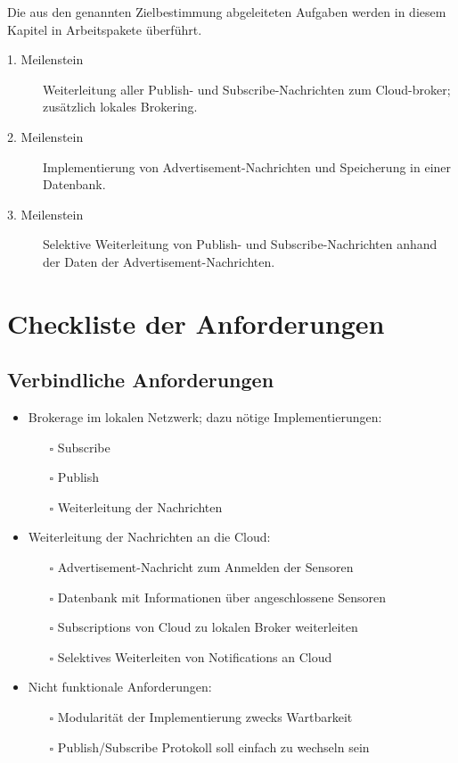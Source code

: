 \documentclass[fontsize=11pt,a4paper]{scrartcl}
\begin{document}
Die aus den genannten Zielbestimmung abgeleiteten Aufgaben werden in diesem Kapitel in Arbeitspakete überführt.

\begin{description}
\item[1. Meilenstein]
Weiterleitung aller Publish- und Subscribe-Nachrichten zum Cloud-broker; zusätzlich lokales Brokering.
\item[2. Meilenstein]
Implementierung von Advertisement-Nachrichten und Speicherung in einer Datenbank.
\item[3. Meilenstein]
Selektive Weiterleitung von Publish- und Subscribe-Nachrichten anhand der Daten der Advertisement-Nachrichten.
\end{description}

\appendix

\section{Checkliste der Anforderungen}

\subsection{Verbindliche Anforderungen}

\begin{itemize}
\item Brokerage im lokalen Netzwerk; dazu nötige Implementierungen:
    \begin{itemize}
    \item[$\square$] Subscribe
    \item[$\square$] Publish
    \item[$\square$] Weiterleitung der Nachrichten
    \end{itemize}
\item Weiterleitung der Nachrichten an die Cloud:
    \begin{itemize}
    \item[$\square$] Advertisement-Nachricht zum Anmelden der Sensoren
    \item[$\square$] Datenbank mit Informationen über angeschlossene Sensoren
    \item[$\square$] Subscriptions von Cloud zu lokalen Broker weiterleiten
    \item[$\square$] Selektives Weiterleiten von Notifications an Cloud
    \end{itemize}
\item Nicht funktionale Anforderungen:
    \begin{itemize}
    \item[$\square$] Modularität der Implementierung zwecks Wartbarkeit
    \item[$\square$] Publish/Subscribe Protokoll soll einfach zu wechseln sein
    \end{itemize}
\end{itemize}
\end{document}
